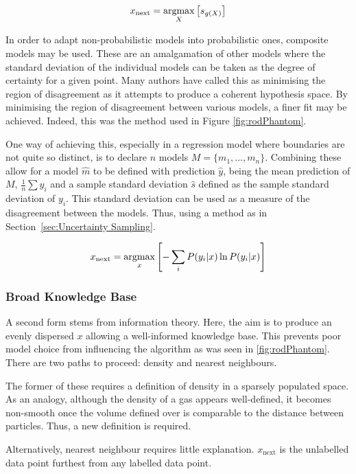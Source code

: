\begin{equation}
  \label{eq:x_next1}
  x_\mathrm{next}=\operatorname*{argmax}_X{\left[s_{g(X)}\right]}
\end{equation}

In order to adapt non-probabilistic models into probabilistic ones, composite models may be used. These are an amalgamation of other models where the standard deviation of the individual models can be taken as the degree of certainty for a given point. Many authors have called this as minimising the region of disagreement as it attempts to produce a coherent hypothesis space. By minimising the region of disagreement between various models, a finer fit may be achieved. Indeed, this was the method used in Figure \ref{fig:rodPhantom}.

One way of achieving this, especially in a regression model where boundaries are not quite so distinct, is to declare $n$ models ${M = \{m_1,\ldots{}, m_n\}}$. Combining these allow for a model $\hat{m}$ to be defined with prediction $\hat{y}$, being the mean prediction of $M$, ${\frac{1}{n}\sum{y_i}}$ and a sample standard deviation $\hat{s}$ defined as the sample standard deviation of $y_i$. This standard deviation can be used as a measure of the disagreement between the models. Thus, using a method as in Section~\ref{sec:Uncertainty Sampling}.

\begin{equation}
  \label{eq:info_uncertainty}
  x_\mathrm{next}=\operatorname*{argmax}_x{\left[-\sum_i{P(y_i|x)\ln{P(y_i|x)}}\right]}
\end{equation}

\subsubsection{Broad Knowledge Base}
A second form stems from information theory. Here, the aim is to produce an evenly dispersed $x$ allowing a well-informed knowledge base. This prevents poor model choice from influencing the algorithm as was seen in \ref{fig:rodPhantom}. There are two paths to proceed: density and nearest neighbours.

The former of these requires a definition of density in a sparsely populated space. As an analogy, although the density of a gas appears well-defined, it becomes non-smooth once the volume defined over is comparable to the distance between particles. Thus, a new definition is required.

Alternatively, nearest neighbour requires little explanation. $x_\mathrm{next}$ is the unlabelled data point furthest from any labelled data point.

